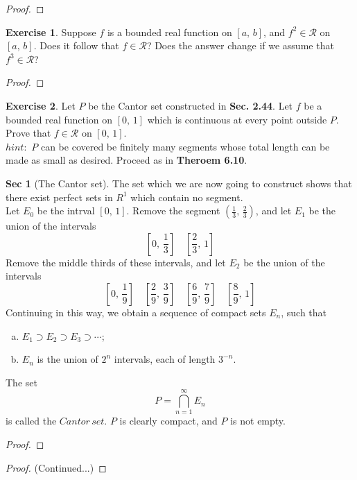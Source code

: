 \documentclass[12pt]{book}
\theoremstyle{definition}
\newtheorem{exe}{Exercise}
\newtheorem{sect}{Sec}
\begin{document}
	\begin{proof}
	\end{proof}
	\newpage
	\begin{exe}
		Suppose $f$ is a bounded real function on $[a,\,b]$, and $f^2\in\mathscr{R}$ on $[a,\,b]$. Does it follow that $f\in\mathscr{R}$? Does the answer change if we assume that $f^3\in\mathscr{R}$?
	\end{exe}
	\begin{proof}
	\end{proof}
	\newpage
	\begin{exe}
		Let $P$ be the Cantor set constructed in \textbf{Sec. 2.44}. Let $f$ be a bounded real function on $[0,\,1]$ which is continuous at every point outside $P$. Prove that $f\in\mathscr{R}$ on $[0,\,1]$.
		\\$hint:$ $P$ can be covered be finitely many segments whose total length can be made as small as desired. Proceed as in \textbf{Theroem 6.10}.
	\end{exe}
	\setcounter{sect}{43}
	\begin{sect}[The Cantor set]
		The set which we are now going to construct shows that there exist perfect sets in $R^1$ which contain no segment.\\
		Let $E_0$ be the intrval $[0,\,1]$. Remove the segment $(\frac{1}{3},\,\frac{2}{3})$, and let $E_1$ be the union of the intervals \begin{equation*}
			\left[0,\,\frac{1}{3}\right]\quad \left[\frac{2}{3},\,1\right]
		\end{equation*}
		Remove the middle thirds of these intervals, and let $E_2$ be the union of the intervals $$\left[0,\,\frac{1}{9}\right]\quad \left[\frac{2}{9},\,\frac{3}{9}\right]\quad \left[\frac{6}{9},\,\frac{7}{9}\right]\quad \left[\frac{8}{9},\,1\right]$$
		Continuing in this way, we obtain a sequence of compact sets $E_n$, such that
		\begin{enumerate}[(a)]
			\item $E_1\supset E_2\supset E_3\supset\cdots$;
			\item $E_n$ is the union of $2^n$ intervals, each of length $3^{-n}$.
		\end{enumerate}
		The set $$P=\displaystyle\bigcap_{n=1}^\infty E_n$$ is called the $Cantor\, set$. $P$ is clearly compact, and $P$ is not empty.
	\end{sect}
	\begin{proof}
	\end{proof}
	\newpage
	\begin{proof}(Continued...)
	\end{proof}
\end{document}
